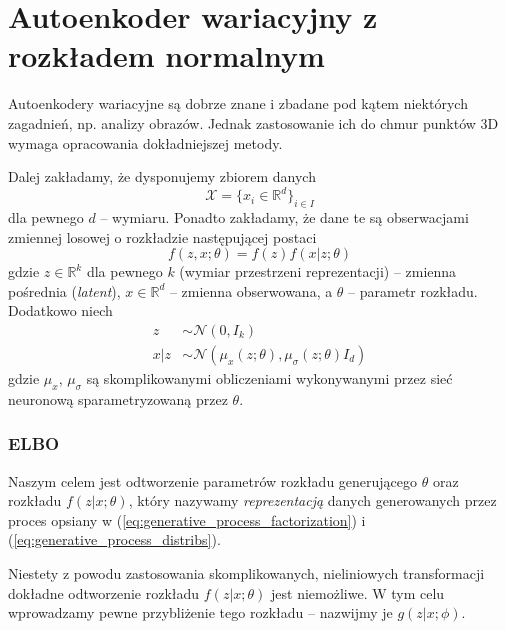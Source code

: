 \documentclass{iithesis}
\begin{document}
\section{Autoenkoder wariacyjny z rozkładem normalnym}
\label{sec:vae_normal}
Autoenkodery wariacyjne są dobrze znane i zbadane pod kątem niektórych zagadnień,
np. analizy obrazów. Jednak zastosowanie ich do chmur punktów 3D wymaga opracowania
dokładniejszej metody.

Dalej zakładamy, że dysponujemy zbiorem danych
$$
\mathcal{X} = \{x_i \in \mathbb{R}^{d}\}_{i \in I}
$$
dla pewnego $d$ -- wymiaru. Ponadto zakładamy, że dane te są obserwacjami
zmiennej losowej o rozkładzie następującej postaci
\begin{equation}
f(z, x; \theta) = f(z)f(x|z; \theta)
\label{eq:generative_process_factorization}
\end{equation}
gdzie $z \in \mathbb{R}^k$ dla pewnego $k$ (wymiar przestrzeni reprezentacji) -- zmienna pośrednia (\textit{latent}), $x \in \mathbb{R}^d$ -- zmienna obserwowana,
a $\theta$ -- parametr rozkładu. Dodatkowo niech
\begin{equation}
\begin{split}
z &\sim \mathcal{N}(0, I_k) \\
x|z &\sim \mathcal{N}(\mu_x(z; \theta), \mu_\sigma(z;\theta)I_d)
\end{split}
\label{eq:generative_process_distribs}
\end{equation}
gdzie $\mu_x,\,\mu_{\sigma}$ są skomplikowanymi obliczeniami
wykonywanymi przez sieć neuronową sparametryzowaną przez $\theta$.

\subsubsection{ELBO} \label{sec:elbo}
Naszym celem jest odtworzenie parametrów rozkładu generującego $\theta$
oraz rozkładu $f(z|x; \theta)$, który nazywamy \textit{reprezentacją} danych
generowanych przez proces opsiany w
(\ref{eq:generative_process_factorization}) i (\ref{eq:generative_process_distribs}).

Niestety z powodu zastosowania skomplikowanych, nieliniowych
transformacji dokładne odtworzenie rozkładu $f(z|x; \theta)$ jest niemożliwe.
W tym celu wprowadzamy pewne przybliżenie tego rozkładu -- nazwijmy je
$g(z|x; \phi)$.
\end{document}

